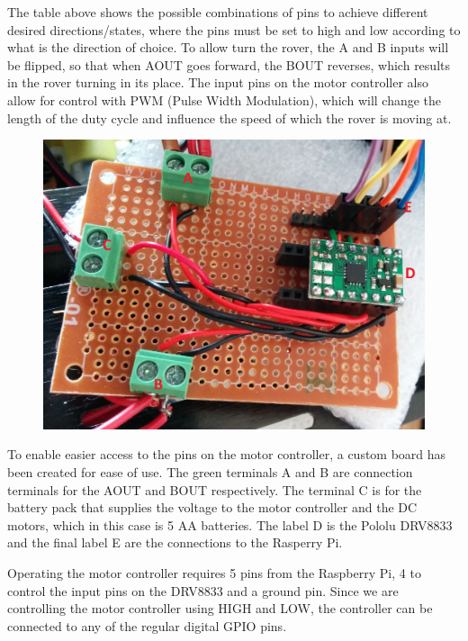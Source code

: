 The table above shows the possible combinations of pins to achieve different desired directions/states, where the pins must be set to high and low according to what is the direction of choice. To allow turn the rover, the A and B inputs will be flipped, so that when AOUT goes forward, the BOUT reverses, which results in the rover turning in its place.
The input pins on the motor controller also allow for control with PWM (Pulse Width Modulation), which will change the length of the duty cycle and influence the speed of which the rover is moving at\cite{DRV8833}.

\begin{figure}[H]
	\centering
	\includegraphics[width=.5\linewidth]{images/labelled.jpg}
\end{figure}

To enable easier access to the pins on the motor controller, a custom board has been created for ease of use. The green terminals A and B are connection terminals for the AOUT and BOUT respectively. The terminal C is for the battery pack that supplies the voltage to the motor controller and the DC motors, which in this case is 5 AA batteries. The label D is the Pololu DRV8833 and the final label E are the connections to the Rasperry Pi. 

Operating the motor controller requires 5 pins from the Raspberry Pi, 4 to control the input pins on the DRV8833 and a ground pin. Since we are controlling the motor controller using HIGH and LOW, the controller can be connected to any of the regular digital GPIO pins.